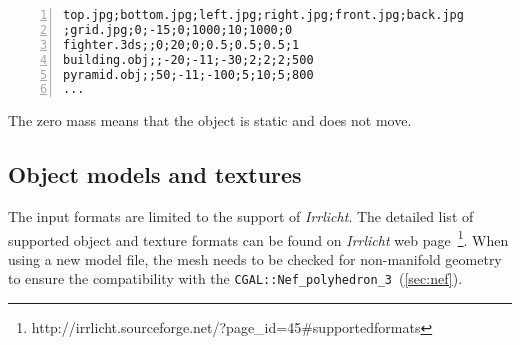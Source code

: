 \begin{centering}
\begin{Verbatim}[frame=single,numbers=left,xleftmargin=5mm]
top.jpg;bottom.jpg;left.jpg;right.jpg;front.jpg;back.jpg
;grid.jpg;0;-15;0;1000;10;1000;0
fighter.3ds;;0;20;0;0.5;0.5;0.5;1
building.obj;;-20;-11;-30;2;2;2;500
pyramid.obj;;50;-11;-100;5;10;5;800
...
\end{Verbatim}
\end{centering}
The zero mass means that the object is static and does not move.

\subsection*{Object models and textures}
The input formats are limited to the support of \emph{Irrlicht}. The detailed list of supported object and texture formats can be found on \emph{Irrlicht} web page~\footnote{http://irrlicht.sourceforge.net/?page\_id=45\#supportedformats}. When using a new model file, the mesh needs to be checked for non-manifold geometry to ensure the compatibility with the {\tt CGAL::Nef\_polyhedron\_3}~(\cref{sec:nef}).


